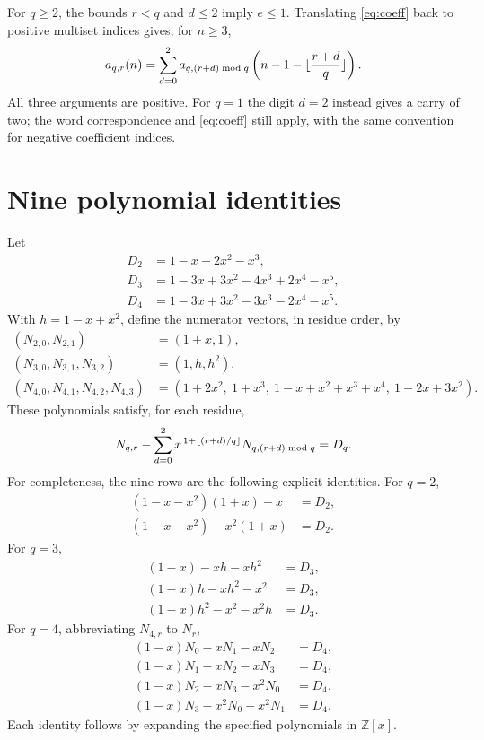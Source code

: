 \documentclass[11pt,a4paper]{article}
\theoremstyle{remark}
\newcommand{\Z}{\mathbb Z}
\DeclarePairedDelimiter{\floor}{\lfloor}{\rfloor}
\begin{document}
For $q\ge2$, the bounds $r<q$ and $d\le2$ imply $e\le1$. Translating
\eqref{eq:coeff} back to positive multiset indices gives, for $n\ge3$,
\begin{equation}\label{eq:positive}
 a_{q,r}(n)=\sum_{d=0}^2
 a_{q,(r+d)\bmod q}\left(n-1-\floor{\frac{r+d}{q}}\right).
\end{equation}
All three arguments are positive. For $q=1$ the digit $d=2$ instead gives
a carry of two; the word correspondence and \eqref{eq:coeff} still apply,
with the same convention for negative coefficient indices.

\section{Nine polynomial identities}

Let
\begin{align*}
 D_2&=1-x-2x^2-x^3,\\
 D_3&=1-3x+3x^2-4x^3+2x^4-x^5,\\
 D_4&=1-3x+3x^2-3x^3-2x^4-x^5.
\end{align*}
With $h=1-x+x^2$, define the numerator vectors, in residue order, by
\begin{align*}
 (N_{2,0},N_{2,1})&=(1+x,1),\\
 (N_{3,0},N_{3,1},N_{3,2})&=(1,h,h^2),\\
 (N_{4,0},N_{4,1},N_{4,2},N_{4,3})
   &=(1+2x^2,\ 1+x^3,\ 1-x+x^2+x^3+x^4,\ 1-2x+3x^2).
\end{align*}
These polynomials satisfy, for each residue,
\begin{equation}\label{eq:certificate}
 N_{q,r}-\sum_{d=0}^2x^{\,1+\floor{(r+d)/q}}
                 N_{q,(r+d)\bmod q}=D_q.
\end{equation}
For completeness, the nine rows are the following explicit identities.
For $q=2$,
\begin{align*}
 (1-x-x^2)(1+x)-x&=D_2,\\
 (1-x-x^2)-x^2(1+x)&=D_2.
\end{align*}
For $q=3$,
\begin{align*}
 (1-x)-xh-xh^2&=D_3,\\
 (1-x)h-xh^2-x^2&=D_3,\\
 (1-x)h^2-x^2-x^2h&=D_3.
\end{align*}
For $q=4$, abbreviating $N_{4,r}$ to $N_r$,
\begin{align*}
 (1-x)N_0-xN_1-xN_2&=D_4,\\
 (1-x)N_1-xN_2-xN_3&=D_4,\\
 (1-x)N_2-xN_3-x^2N_0&=D_4,\\
 (1-x)N_3-x^2N_0-x^2N_1&=D_4.
\end{align*}
Each identity follows by expanding the specified polynomials in $\Z[x]$.
\end{document}
